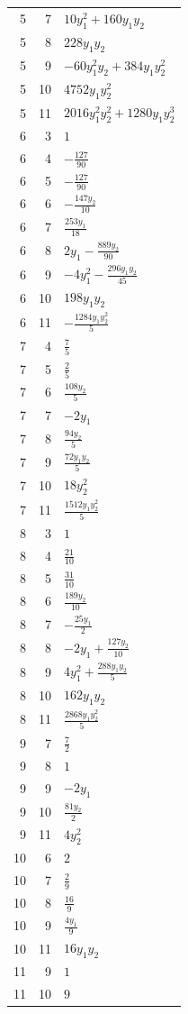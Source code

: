 \documentclass[10pt,a4paper]{article}
\begin{document}
{\begin{longtable}{rrp{125mm}}
5 & 7 & $10 y_{1}^{2} + 160 y_{1} y_{2}$\\
5 & 8 & $228 y_{1} y_{2}$\\
5 & 9 & $- 60 y_{1}^{2} y_{2} + 384 y_{1} y_{2}^{2}$\\
5 & 10 & $4752 y_{1} y_{2}^{2}$\\
5 & 11 & $2016 y_{1}^{2} y_{2}^{2} + 1280 y_{1} y_{2}^{3}$\\
6 & 3 & $1$\\
6 & 4 & $- \frac{127}{90}$\\
6 & 5 & $- \frac{127}{90}$\\
6 & 6 & $- \frac{147 y_{2}}{10}$\\
6 & 7 & $\frac{253 y_{1}}{18}$\\
6 & 8 & $2 y_{1} - \frac{889 y_{2}}{90}$\\
6 & 9 & $- 4 y_{1}^{2} - \frac{296 y_{1} y_{2}}{45}$\\
6 & 10 & $198 y_{1} y_{2}$\\
6 & 11 & $- \frac{1284 y_{1} y_{2}^{2}}{5}$\\
7 & 4 & $\frac{7}{5}$\\
7 & 5 & $\frac{2}{5}$\\
7 & 6 & $\frac{108 y_{2}}{5}$\\
7 & 7 & $- 2 y_{1}$\\
7 & 8 & $\frac{94 y_{2}}{5}$\\
7 & 9 & $\frac{72 y_{1} y_{2}}{5}$\\
7 & 10 & $18 y_{2}^{2}$\\
7 & 11 & $\frac{1512 y_{1} y_{2}^{2}}{5}$\\
8 & 3 & $1$\\
8 & 4 & $\frac{21}{10}$\\
8 & 5 & $\frac{31}{10}$\\
8 & 6 & $\frac{189 y_{2}}{10}$\\
8 & 7 & $- \frac{25 y_{1}}{2}$\\
8 & 8 & $- 2 y_{1} + \frac{127 y_{2}}{10}$\\
8 & 9 & $4 y_{1}^{2} + \frac{288 y_{1} y_{2}}{5}$\\
8 & 10 & $162 y_{1} y_{2}$\\
8 & 11 & $\frac{2868 y_{1} y_{2}^{2}}{5}$\\
9 & 7 & $\frac{7}{2}$\\
9 & 8 & $1$\\
9 & 9 & $- 2 y_{1}$\\
9 & 10 & $\frac{81 y_{2}}{2}$\\
9 & 11 & $4 y_{2}^{2}$\\
10 & 6 & $2$\\
10 & 7 & $\frac{2}{9}$\\
10 & 8 & $\frac{16}{9}$\\
10 & 9 & $\frac{4 y_{1}}{9}$\\
10 & 11 & $16 y_{1} y_{2}$\\
11 & 9 & $1$\\
11 & 10 & $9$\\
\end{longtable}}
\end{document}
